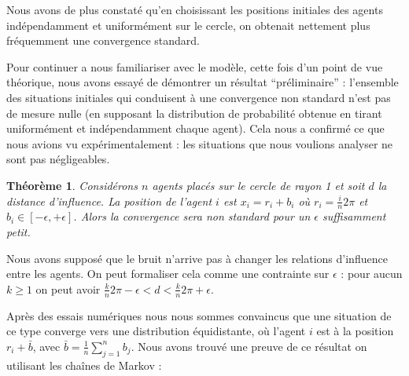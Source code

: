 \documentclass[a4paper,10pt]{article}
\newtheorem{theorem}{Théorème}
\begin{document}
Nous avons de plus constaté qu'en choisissant les positions initiales des agents indépendamment et uniformément sur le cercle, on obtenait nettement plus fréquemment une convergence standard.

Pour continuer a nous familiariser avec le modèle, cette fois d'un point de vue théorique, nous avons essayé de démontrer un résultat ``préliminaire'' : l'ensemble des situations initiales qui conduisent à une convergence non standard n'est pas de mesure nulle (en supposant la distribution de probabilité obtenue en tirant uniformément et indépendamment chaque agent). Cela nous a confirmé ce que nous avions vu expérimentalement : les situations que nous voulions analyser ne sont pas négligeables.

\begin{theorem}
\label{convergence-non-standard}
Considérons $n$ agents placés sur le cercle de rayon 1 et soit $d$ la distance d'influence. La position de l'agent $i$ est $x_i = r_i + b_i$ où $r_i = \frac{i}{n} 2 \pi$ et $b_i \in [-\epsilon, +\epsilon]$. Alors la convergence sera non standard pour un $\epsilon$ suffisamment petit.
\end{theorem}

Nous avons supposé que le bruit n'arrive pas à changer les relations d'influence entre les agents. On peut formaliser cela comme une contrainte sur $\epsilon$ : pour aucun $k \ge 1$ on peut avoir $\frac{k}{n} 2 \pi - \epsilon < d < \frac{k}{n} 2 \pi + \epsilon$.

Après des essais numériques nous nous sommes convaincus que une situation de ce type converge vers une distribution équidistante, où l'agent $i$ est à la position $r_i + \bar b$, avec $\bar b = \frac{1}{n} \sum_{j=1}^n b_j$. Nous avons trouvé une preuve de ce résultat on utilisant les chaînes de Markov :
\end{document}
